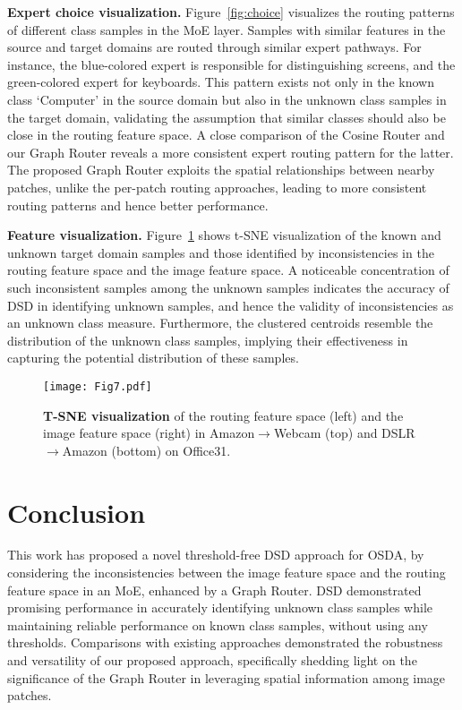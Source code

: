 \documentclass[10pt,twocolumn,letterpaper]{article}
\begin{document}
\textbf{Expert choice visualization.} Figure~\ref{fig:choice} visualizes the routing patterns of different class samples in the MoE layer. Samples with similar features in the source and target domains are routed through similar expert pathways. For instance, the blue-colored expert is responsible for distinguishing screens, and the green-colored expert for keyboards. This pattern exists not only in the known class `Computer' in the source domain but also in the unknown class samples in the target domain, validating the assumption that similar classes should also be close in the routing feature space. A close comparison of the Cosine Router and our Graph Router reveals a more consistent expert routing pattern for the latter. The proposed Graph Router exploits
the spatial relationships between nearby patches, unlike the per-patch routing approaches, leading to more consistent routing patterns and hence better performance.

\textbf{Feature visualization.} Figure~\ref{fig:tsne} shows t-SNE \cite{van2008visualizing} visualization of the known and unknown target domain samples and those identified by inconsistencies in the routing feature space and the image feature space. A noticeable concentration of such inconsistent samples among the unknown samples indicates the accuracy of DSD in identifying unknown samples, and hence the validity of inconsistencies as an unknown class measure. Furthermore, the clustered centroids resemble the distribution of the unknown class samples, implying their effectiveness in capturing the potential distribution of these samples.


\begin{figure}[htpb]  \centering
  \texttt{[image: Fig7.pdf]}
  \caption{\textbf{T-SNE visualization} of the routing feature space (left) and the image feature space (right) in Amazon$\rightarrow$Webcam (top) and DSLR$\rightarrow$Amazon (bottom) on Office31.} 
  \label{fig:tsne} \vspace{-0.16in}
\end{figure}

\section{Conclusion}

This work has proposed a novel threshold-free DSD approach for OSDA, by considering the inconsistencies between the image feature space and the routing feature space in an MoE, enhanced by a Graph Router. DSD demonstrated promising performance in accurately identifying unknown class samples while maintaining reliable performance on known class samples, without using any thresholds. Comparisons with existing approaches demonstrated the robustness and versatility of our proposed approach, specifically shedding light on the significance of the Graph Router in leveraging spatial information among image patches. 
\end{document}
